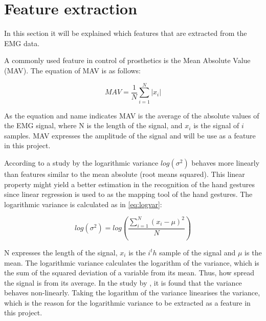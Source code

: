 \section{Feature extraction}
In this section it will be explained which features that are extracted from the EMG data.

A commonly used feature in control of prosthetics is the Mean Absolute Value (MAV). The equation of MAV is as follows:

\begin{equation}
MAV = \frac{1}{N}\sum\limits_{i=1}^N|x_i|
\end{equation}

As the equation and name indicates MAV is the average of the absolute values of the EMG signal, where N is the length of the signal, and $x_i$ is the signal of $i$ samples. MAV expresses the amplitude of the signal and will be use as a feature in this project.

According to a study by \cite{hahne2014} the logarithmic variance $log(\sigma^2)$ behaves more linearly than features similar to the mean absolute (root means squared). This linear property might yield a better estimation in the recognition of the hand gestures since linear regression is used to as the mapping tool of the hand gestures. The logarithmic variance is calculated as in \eqref{eq:logvar}:

\begin{equation} \label{eq:logvar}
log(\sigma^2) = log(\frac{\sum\limits_{i=1}^N(x_i - \mu)^2}{N})
\end{equation}

N expresses the length of the signal, $x_i$ is the $i^th$ sample of the signal and $\mu$ is the mean. The logarithmic variance calculates the logarithm of the variance, which is the sum of the squared deviation of a variable from its mean. Thus, how spread the signal is from its average. In the study by \cite{hahne2014}, it is found that the variance behaves non-linearly. Taking the logarithm of the variance linearises the variance, which is the reason for the logarithmic variance to be extracted as a feature in this project. 

